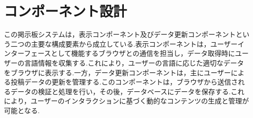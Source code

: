 \documentclass[b5paper,12pt,dvipdfmx]{jsreport}
\begin{document}
\section{コンポーネント設計}
この掲示板システムは，表示コンポーネント及びデータ更新コンポーネントという二つの主要な構成要素から成立している.表示コンポーネントは，ユーザーインターフェースとして機能するブラウザとの通信を担当し，データ取得時にユーザーの言語情報を収集する.これにより，ユーザーの言語に応じた適切なデータをブラウザに表示する.一方，データ更新コンポーネントは，主にユーザーによる投稿データの更新を管理する.このコンポーネントは，ブラウザから送信されるデータの検証と処理を行い，その後，データベースにデータを保存する.これにより，ユーザーのインタラクションに基づく動的なコンテンツの生成と管理が可能となる.



\end{document}
